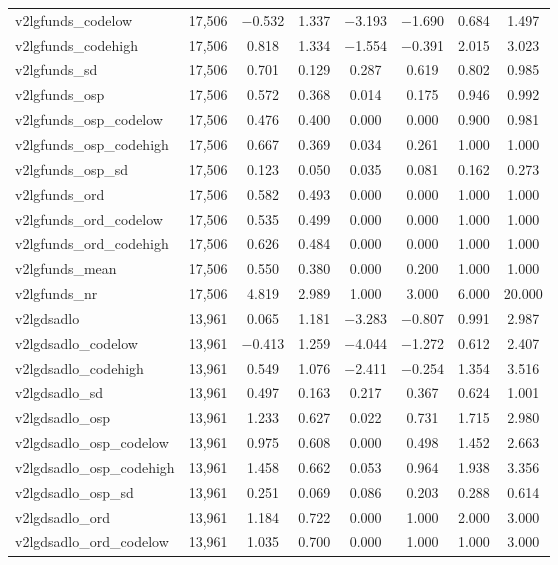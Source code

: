\begin{table}[!htbp]
\begin{tabular}{@{\extracolsep{5pt}}lccccccc}
v2lgfunds\_codelow & 17,506 & $-$0.532 & 1.337 & $-$3.193 & $-$1.690 & 0.684 & 1.497 \\ 
v2lgfunds\_codehigh & 17,506 & 0.818 & 1.334 & $-$1.554 & $-$0.391 & 2.015 & 3.023 \\ 
v2lgfunds\_sd & 17,506 & 0.701 & 0.129 & 0.287 & 0.619 & 0.802 & 0.985 \\ 
v2lgfunds\_osp & 17,506 & 0.572 & 0.368 & 0.014 & 0.175 & 0.946 & 0.992 \\ 
v2lgfunds\_osp\_codelow & 17,506 & 0.476 & 0.400 & 0.000 & 0.000 & 0.900 & 0.981 \\ 
v2lgfunds\_osp\_codehigh & 17,506 & 0.667 & 0.369 & 0.034 & 0.261 & 1.000 & 1.000 \\ 
v2lgfunds\_osp\_sd & 17,506 & 0.123 & 0.050 & 0.035 & 0.081 & 0.162 & 0.273 \\ 
v2lgfunds\_ord & 17,506 & 0.582 & 0.493 & 0.000 & 0.000 & 1.000 & 1.000 \\ 
v2lgfunds\_ord\_codelow & 17,506 & 0.535 & 0.499 & 0.000 & 0.000 & 1.000 & 1.000 \\ 
v2lgfunds\_ord\_codehigh & 17,506 & 0.626 & 0.484 & 0.000 & 0.000 & 1.000 & 1.000 \\ 
v2lgfunds\_mean & 17,506 & 0.550 & 0.380 & 0.000 & 0.200 & 1.000 & 1.000 \\ 
v2lgfunds\_nr & 17,506 & 4.819 & 2.989 & 1.000 & 3.000 & 6.000 & 20.000 \\ 
v2lgdsadlo & 13,961 & 0.065 & 1.181 & $-$3.283 & $-$0.807 & 0.991 & 2.987 \\ 
v2lgdsadlo\_codelow & 13,961 & $-$0.413 & 1.259 & $-$4.044 & $-$1.272 & 0.612 & 2.407 \\ 
v2lgdsadlo\_codehigh & 13,961 & 0.549 & 1.076 & $-$2.411 & $-$0.254 & 1.354 & 3.516 \\ 
v2lgdsadlo\_sd & 13,961 & 0.497 & 0.163 & 0.217 & 0.367 & 0.624 & 1.001 \\ 
v2lgdsadlo\_osp & 13,961 & 1.233 & 0.627 & 0.022 & 0.731 & 1.715 & 2.980 \\ 
v2lgdsadlo\_osp\_codelow & 13,961 & 0.975 & 0.608 & 0.000 & 0.498 & 1.452 & 2.663 \\ 
v2lgdsadlo\_osp\_codehigh & 13,961 & 1.458 & 0.662 & 0.053 & 0.964 & 1.938 & 3.356 \\ 
v2lgdsadlo\_osp\_sd & 13,961 & 0.251 & 0.069 & 0.086 & 0.203 & 0.288 & 0.614 \\ 
v2lgdsadlo\_ord & 13,961 & 1.184 & 0.722 & 0.000 & 1.000 & 2.000 & 3.000 \\ 
v2lgdsadlo\_ord\_codelow & 13,961 & 1.035 & 0.700 & 0.000 & 1.000 & 1.000 & 3.000 \\ 

\end{tabular}
\end{table}

